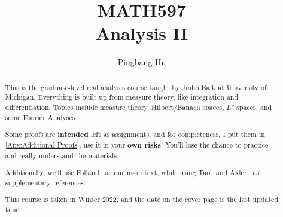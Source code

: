 \documentclass[a4paper]{report}
\author{Pingbang Hu}
\title{MATH597\\Analysis II}
\begin{document}
\maketitle

\begin{abstract}
	This is the graduate-level real analysis course taught by \href{http://www.math.lsa.umich.edu/~baik/Welcome.html}{Jinho Baik} at University of Michigan. Everything is built up from measure theory, like integration and differentiation. Topics include measure theory, Hilbert/Banach spaces, \(L^p\) spaces, and some Fourier Analyses.

	Some proofs are \textbf{intended} left as assignments, and for completeness, I put them in \autoref{Apx:Additional-Proofs}, use it in your \textbf{own risks}! You'll lose the chance to practice and really understand the materials.

	Additionally, we'll use Folland~\cite{folland1999real} as our main text, while using Tao~\cite{tao2013introduction} and Axler~\cite{axler2019measure} as supplementary references.

	\vfill
	This course is taken in Winter 2022, and the date on the cover page is the last updated time.
\end{abstract}

\tableofcontents


\newpage
\appendix
\appendixpage{}



\newpage
\pagestyle{plain}
\printbibliography{}
\end{document}
